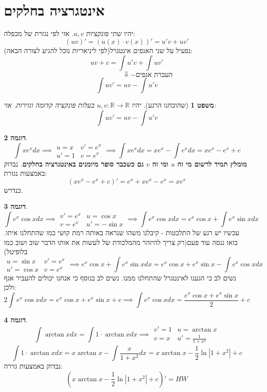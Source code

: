 \documentclass[12pt]{article}
\let\oldint\int
\renewcommand{\int}{\oldint\limits}
\theoremstyle{plain}
\newtheorem{theorem}{משפט}[section]      %
\theoremstyle{definition}
\newtheorem{example}[theorem]{דוגמה}      %
\theoremstyle{remark}
\begin{document}
\section{אינטגרציה בחלקים}
יהיו שתי פונקציות \({u,v}\). אזי לפי נגזרת של מכפלה:\[
{(uv)'=(u(x)\cdot v(x))'=u'v+uv'}
\]
נפעיל על שני האגפים אינטגרל(לפי ליניאריות נוכל להגיע לצורה הבאה):\[
{uv+c=\int u'v+\int uv'}
\]
\[
{\qquad \qquad \qquad \Downarrow - {\text{העברת אגפים}}}
\]
\[
{\int uv'=uv-\int u'v}
\]
\begin{theorem}[שהוכחנו הרגע]
יהיו \({u,v:\mathbb{R}\to \mathbb{R}}\) בעלות פונקציה קדומה וגזירות. אזי:\[
{\int uv'=uv-\int u'v}
\]

\end{theorem}
\begin{example}
\[
{\int xe^xdx \implies \begin{matrix}
u=x & v'=e^x \\
u'=1 & v=e^x
\end{matrix} \implies \int xe^xdx=xe^x-\int e^xdx=xe^x-e^x+c}
\]
\textbf{מומלץ תמיד לרשום מי זה \({u}\) ומי זה \({v}\) גם כשכבר סופר מיומנים באינטגרציה בחלקים}.\newline{}
נבדוק באמצעות נגזרת:\[
{(xe^x-e^x+c)'=e^x+xe^x-e^x=xe^x}
\]
כנדרש.
\end{example}
\begin{example}
\[
{\int e^x\cos xdx\implies \begin{matrix}
v'=e^x & u=\cos x \\
v=e^x & u'=-\sin x
\end{matrix}\implies \int e^x\cos xdx=e^x\cos x+\int e^x\sin xdx}
\]
עכשיו יש רגע של התלבטות - קיבלנו משהו שנראה באותה רמת קושי כמו שהתחלנו איתו. בואו ננסה עוד פעם(רק צריך להיזהר מהמלכודת של לעשות את אותו הדבר שוב ושוב כמו בלופיטל)\[
{\begin{matrix}
u=\sin x & v'=e^x \\
u'=\cos x & v=e^x
\end{matrix}\implies e^x\cos x+\int e^x\sin xdx=e^x\cos x+e^x\sin x-\int e^x\cos xdx}
\]
נשים לב כי הגענו לאינטגרל שהתחלנו ממנו. נשים לב בנוסף כי אנחנו יכולים להעביר אגף ולכן:\[
{2\int e^x\cos xdx=e^x\cos x+e^x\sin x+c \implies \int e^x\cos xdx=\frac{e^x\cos x+e^x\sin x}{2}+c}
\]

\end{example}
\begin{example}
\[
{\int \arctan xdx=\int 1\cdot \arctan xdx\implies \begin{matrix}
v'=1 & u=\arctan x \\
v=x & u'=\frac{1}{1+x^2}
\end{matrix}}
\]
\[
{\int 1\cdot \arctan xdx=x \arctan x-\int \frac{x}{1+x^2}dx=x\arctan x-\frac{1}{2}\ln |1+x^2|+c}
\]
נבדוק באמצעות גזירה:\[
{\left( x \arctan x-\frac{1}{2}\ln |1+x^2|+c \right)'= HW}
\]

\end{example}
\end{document}

